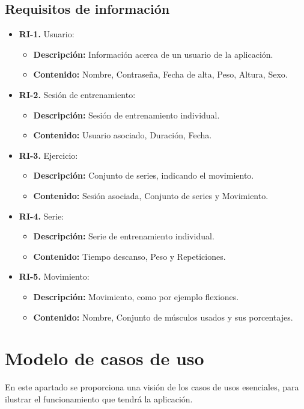 \subsection{Requisitos de información}
\begin{itemize}
  \item \textbf{RI-1.} Usuario:
  \begin{itemize}
    \item \textbf{Descripción:} Información acerca de un usuario de la aplicación.
    
    \item \textbf{Contenido:} Nombre, Contraseña, Fecha de alta, Peso, Altura, Sexo.
  \end{itemize}
  \item \textbf{RI-2.} Sesión de entrenamiento:
    \begin{itemize}
    \item \textbf{Descripción:} Sesión de entrenamiento individual.
    \item \textbf{Contenido:} Usuario asociado, Duración, Fecha.
  \end{itemize}
  \item \textbf{RI-3.} Ejercicio:
    \begin{itemize}
    \item \textbf{Descripción:}  Conjunto de series, indicando el movimiento.
    \item \textbf{Contenido:}  Sesión asociada, Conjunto de series y Movimiento.
  \end{itemize}
  \item \textbf{RI-4.} Serie:
    \begin{itemize}
    \item \textbf{Descripción:} Serie de entrenamiento individual.
    \item \textbf{Contenido:} Tiempo descanso, Peso y  Repeticiones.
  \end{itemize}
  \item \textbf{RI-5.} Movimiento:
    \begin{itemize}
    \item \textbf{Descripción:}  Movimiento, como por ejemplo flexiones.
    \item \textbf{Contenido:}  Nombre, Conjunto de músculos usados y sus porcentajes.
  \end{itemize}
\end{itemize}

\section {Modelo de casos de uso}
En este apartado se proporciona una visión de los casos de usos esenciales, para ilustrar el funcionamiento que tendrá la aplicación.
